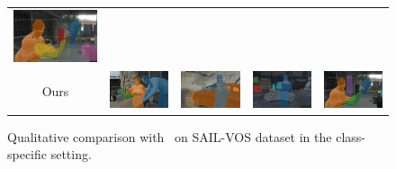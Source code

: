 \begin{figure}[t]
\begin{tabular}{ccccc}
    \includegraphics[align=c,width=0.23\linewidth]{fig/sailvos_results/22243_base}
    \\
    Ours &
    \includegraphics[align=c,width=0.23\linewidth]{fig/sailvos_results/21781_ours} &
    \includegraphics[align=c,width=0.23\linewidth]{fig/sailvos_results/10561_ours} &
    \includegraphics[align=c,width=0.23\linewidth]{fig/sailvos_results/14498_ours} &
    \includegraphics[align=c,width=0.23\linewidth]{fig/sailvos_results/22243_ours}
    \end{tabular}
    \vspace{-0.25cm}
    \caption{Qualitative comparison with~\cite{hu2019sail} on SAIL-VOS dataset in the class-specific setting.
    }
    \label{fig:qual_result}
    \vspace{-0.25cm}
    \end{figure}
    
    
    
